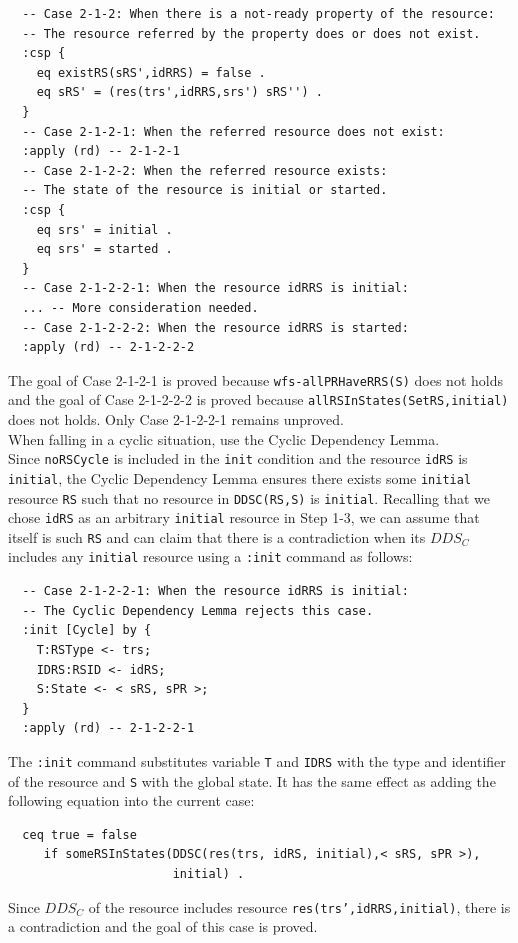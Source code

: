\documentclass[12pt]{report}
\newcommand{\stt}[1]{{\small{\tt {#1}}}}
\begin{document}
\small
\begin{verbatim}
  -- Case 2-1-2: When there is a not-ready property of the resource:
  -- The resource referred by the property does or does not exist.
  :csp {
    eq existRS(sRS',idRRS) = false .
    eq sRS' = (res(trs',idRRS,srs') sRS'') .
  }
  -- Case 2-1-2-1: When the referred resource does not exist:
  :apply (rd) -- 2-1-2-1
  -- Case 2-1-2-2: When the referred resource exists:
  -- The state of the resource is initial or started.
  :csp { 
    eq srs' = initial .
    eq srs' = started .
  }
  -- Case 2-1-2-2-1: When the resource idRRS is initial:
  ... -- More consideration needed.
  -- Case 2-1-2-2-2: When the resource idRRS is started:
  :apply (rd) -- 2-1-2-2-2
\end{verbatim}
\normalsize
The goal of Case 2-1-2-1 is proved because \stt{wfs-allPRHaveRRS(S)}
does not holds and the goal of Case 2-1-2-2-2 is proved because
\stt{allRSInStates(SetRS,initial)} does not holds.  Only Case
2-1-2-2-1 remains unproved.\\

 When falling in a cyclic situation, use the
Cyclic Dependency Lemma. \\
Since {\tt noRSCycle} is included in the {\tt init} condition and the
resource {\tt idRS} is {\tt initial}, the Cyclic Dependency Lemma
ensures there exists some {\tt initial} resource {\tt RS} such that no
resource in \stt{DDSC(RS,S)} is {\tt initial}. Recalling that we chose
{\tt idRS} as an arbitrary {\tt initial} resource in Step 1-3, we can
assume that itself is such {\tt RS} and can claim that there is a
contradiction when its $DDS\!_C$ includes any {\tt initial} resource
using a {\tt :init} command as follows:
\small
\begin{verbatim}
  -- Case 2-1-2-2-1: When the resource idRRS is initial:
  -- The Cyclic Dependency Lemma rejects this case.
  :init [Cycle] by {
    T:RSType <- trs;
    IDRS:RSID <- idRS;
    S:State <- < sRS, sPR >;
  }
  :apply (rd) -- 2-1-2-2-1
\end{verbatim}
\normalsize
The {\tt :init} command substitutes variable {\tt T} and {\tt IDRS}
with the type and identifier of the resource and {\tt S} with the
global state. It has the same effect as adding the following equation
into the current case:
\small
\begin{verbatim}
  ceq true = false
     if someRSInStates(DDSC(res(trs, idRS, initial),< sRS, sPR >),
                       initial) .
\end{verbatim}
\normalsize
Since $DDS\!_C$ of the resource
includes resource \stt{res(trs',idRRS,initial)}, there is a
contradiction and the goal of this case is proved.
\end{document}
